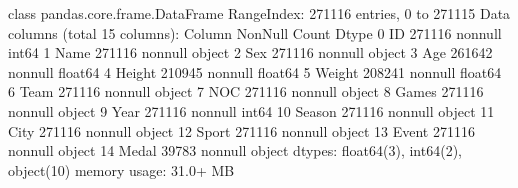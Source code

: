 \documentclass[letterpaper,10pt,english]{jupyterBook}
\begin{document}
\begin{sphinxVerbatim}[commandchars=\\\{\}]
\end{sphinxVerbatim}

\begin{sphinxVerbatim}[commandchars=\\\{\}]
\PYGZlt{}class \PYGZsq{}pandas.core.frame.DataFrame\PYGZsq{}\PYGZgt{}
RangeIndex: 271116 entries, 0 to 271115
Data columns (total 15 columns):
 \PYGZsh{}   Column  Non\PYGZhy{}Null Count   Dtype  
\PYGZhy{}\PYGZhy{}\PYGZhy{}  \PYGZhy{}\PYGZhy{}\PYGZhy{}\PYGZhy{}\PYGZhy{}\PYGZhy{}  \PYGZhy{}\PYGZhy{}\PYGZhy{}\PYGZhy{}\PYGZhy{}\PYGZhy{}\PYGZhy{}\PYGZhy{}\PYGZhy{}\PYGZhy{}\PYGZhy{}\PYGZhy{}\PYGZhy{}\PYGZhy{}   \PYGZhy{}\PYGZhy{}\PYGZhy{}\PYGZhy{}\PYGZhy{}  
 0   ID      271116 non\PYGZhy{}null  int64  
 1   Name    271116 non\PYGZhy{}null  object 
 2   Sex     271116 non\PYGZhy{}null  object 
 3   Age     261642 non\PYGZhy{}null  float64
 4   Height  210945 non\PYGZhy{}null  float64
 5   Weight  208241 non\PYGZhy{}null  float64
 6   Team    271116 non\PYGZhy{}null  object 
 7   NOC     271116 non\PYGZhy{}null  object 
 8   Games   271116 non\PYGZhy{}null  object 
 9   Year    271116 non\PYGZhy{}null  int64  
 10  Season  271116 non\PYGZhy{}null  object 
 11  City    271116 non\PYGZhy{}null  object 
 12  Sport   271116 non\PYGZhy{}null  object 
 13  Event   271116 non\PYGZhy{}null  object 
 14  Medal   39783 non\PYGZhy{}null   object 
dtypes: float64(3), int64(2), object(10)
memory usage: 31.0+ MB
\end{sphinxVerbatim}

\begin{sphinxVerbatim}[commandchars=\\\{\}]
\PYG{p}{[}\PYG{p}{[}     \PYG{p}{]}\PYG{p}{]}  \PYG{p}{[}\PYG{p}{[}     \PYG{p}{]}\PYG{p}{]}
\end{sphinxVerbatim}
\end{document}
